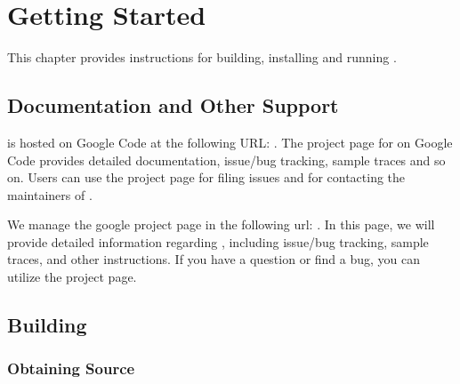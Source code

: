 

\chapter{Getting Started}


This chapter provides instructions for building, installing and running \SIM.



\section{Documentation and Other Support}


\SIM is hosted on Google Code at the following URL:
. The project page for \SIM on Google
Code provides detailed documentation, issue/bug tracking, sample traces and
so on. Users can use the project page for filing issues and for contacting the
maintainers of \SIM.

\ignore
{
We manage the google project page in the following url:
. In this page, we will provide
detailed information regarding \SIM, including issue/bug tracking,
sample traces, and other instructions. If you have a question or find
a bug, you can utilize the project page.
}



\section{Building \SIM}
\label{sec:installation}

\subsection{Obtaining Source}

